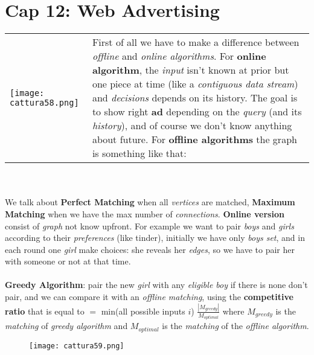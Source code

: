 \documentclass{article}
\begin{document}
\section{Cap 12: Web Advertising}
\begin{tabular}{C{7cm}  L{7cm}}
\texttt{[image: cattura58.png]} &
First of all we have to make a difference between \emph{offline} and \emph{online algorithms}. For \textbf{online algorithm}, the \emph{input} isn't known at prior but one piece at time (like a \emph{contiguous data stream}) and \emph{decisions} depends on its history. The goal is to show right \textbf{ad} depending on the \emph{query} (and its \emph{history}), and of course we don't know anything about future. For \textbf{offline algorithms} the graph is something like that:
\end{tabular}\\\\
We talk about \textbf{Perfect Matching} when all \emph{vertices} are matched, \textbf{Maximum Matching} when we have the max number of \emph{connections}. \textbf{Online version} consist of \emph{graph} not know upfront. For example we want to pair \emph{boys} and \emph{girls} according to their \emph{preferences} (like tinder), initially we have only \emph{boys set}, and in each round one \emph{girl} make choices: she reveals her \emph{edges}, so we have to pair her with someone or not at that time. \\\\
\textbf{Greedy Algorithm}: pair the new \emph{girl} with any \emph{eligible boy} if there is none don't pair, and we can compare it with an \emph{offline matching}, using the \textbf{competitive ratio} that is equal to $=$ min(all possible inputs $i$) $\frac{|M_{greedy}|}{M_{optimal }}$ where $M_{greedy}$ is the \emph{matching} of \emph{greedy algorithm} and $M_{optimal}$ is the \emph{matching} of the \emph{offline algorithm}. 
\begin{figure}[H]
  \centering
  \texttt{[image: cattura59.png]}
\end{figure}
\end{document}
